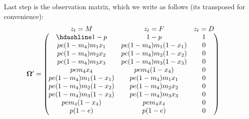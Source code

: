 \documentclass[
  12pt,
]{krantz}
\begin{document}
Last step is the observation matrix, which we write as follows (its transposed for convenience):
\[\begin{matrix}
& \\
\mathbf{\Omega'} =
  \left ( \vphantom{ \begin{matrix} 12 \\ 12 \\ 12 \\ 12 \\ 12 \\ 12 \\ 12 \\ 12 \\ 12 \\ 12 \end{matrix} } \right .
          \end{matrix}
          \hspace{-1.2em}
          \begin{matrix}
          z_t=M & z_t=F & z_t=D \\ \hdashline
          1 - p  & 1 - p & 1\\
          p e (1-m_4) m_1 x_1 & p e (1-m_4) m_1 (1-x_1) & 0\\
          p e (1-m_4) m_2 x_2 & p e (1-m_4) m_2 (1-x_2) & 0\\
          p e (1-m_4) m_3 x_3 & p e (1-m_4) m_3 (1-x_3) & 0\\
          p e m_4 x_4 & p e m_4 (1-x_4) & 0\\
          p e (1-m_4) m_1 (1-x_1) & p e (1-m_4) m_1 x_1 & 0\\
          p e (1-m_4) m_2 (1-x_2) & p e (1-m_4) m_2 x_2 & 0\\
          p e (1-m_4) m_3 (1-x_3) & p e (1-m_4) m_3 x_3 & 0\\
          p e m_4 (1-x_4) & p e m_4 x_4 & 0\\
          p (1-e) & p (1-e) & 0\\
          \end{matrix}
          \hspace{-0.2em}
          \begin{matrix}
          & \\
          \left . \vphantom{ \begin{matrix} 12 \\ 12 \\ 12 \\ 12 \\ 12 \\ 12 \\ 12 \\ 12 \\ 12 \\ 12\end{matrix} } \right )

\end{matrix}\]
\end{document}
